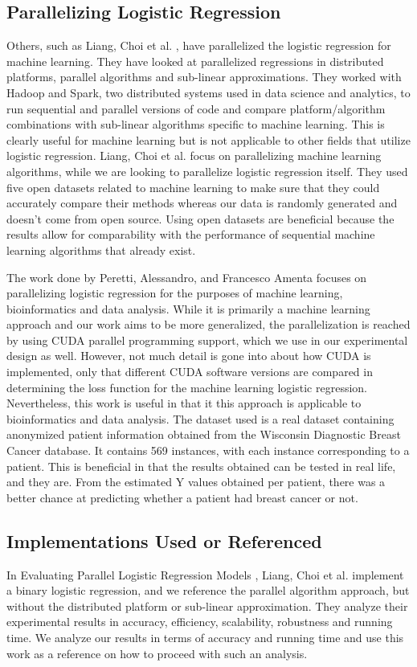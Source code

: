 \documentclass[letterpaper, 10 pt, conference]{ieeeconf}  %
\begin{document}
\subsection{Parallelizing Logistic Regression}
Others, such as Liang, Choi et al. \cite{c2}, have parallelized the logistic regression for machine learning. They have looked at parallelized regressions in distributed platforms, parallel algorithms and sub-linear approximations. They worked with Hadoop and Spark, two distributed systems used in data science and analytics, to run sequential and parallel versions of code and compare platform/algorithm combinations with sub-linear algorithms specific to machine learning. This is clearly useful for machine learning but is not applicable to other fields that utilize logistic regression. Liang, Choi et al. focus on parallelizing machine learning algorithms, while we are looking to parallelize logistic regression itself. They used five open datasets related to machine learning to make sure that they could accurately compare their methods whereas our data is randomly generated and doesn’t come from open source. Using open datasets are beneficial because the results allow for comparability with the performance of sequential machine learning algorithms that already exist. 

The work done by Peretti, Alessandro, and Francesco Amenta \cite{c3} focuses on parallelizing logistic regression for the purposes of machine learning, bioinformatics and data analysis. While it is primarily a machine learning approach and our work aims to be more generalized, the parallelization is reached by using CUDA parallel programming support, which we use in our experimental design as well. However, not much detail is gone into about how CUDA is implemented, only that different CUDA software versions are compared in determining the loss function for the machine learning logistic regression. Nevertheless, this work is useful in that it this approach is applicable to bioinformatics and data analysis. The dataset used is a real dataset containing anonymized patient information obtained from the Wisconsin Diagnostic Breast Cancer database. It contains 569 instances, with each instance corresponding to a patient. This is beneficial in that the results obtained can be tested in real life, and they are. From the estimated Y values obtained per patient, there was a better chance at predicting whether a patient had breast cancer or not.  


\subsection{Implementations Used or Referenced} 
In Evaluating Parallel Logistic Regression Models \cite{c2}, Liang, Choi et al. implement a binary logistic regression, and we reference the parallel algorithm approach, but without the distributed platform or sub-linear approximation. They analyze their experimental results in accuracy, efficiency, scalability, robustness and running time. We analyze our results in terms of accuracy and running time and use this work as a reference on how to proceed with such an analysis. 
\end{document}
